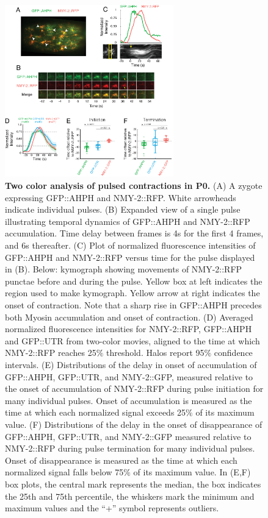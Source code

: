 \begin{figure}[!htbp]
\centering
\includegraphics[width=0.65\textwidth]{pulse/Figure2-14}

\caption{\label{fig:2214} \textbf{Two color analysis of pulsed contractions in P0.} (A) A zygote expressing GFP::AHPH and NMY-2::RFP. White arrowheads indicate individual pulses. (B) Expanded view of a single pulse illustrating temporal dynamics of GFP::AHPH and NMY-2::RFP accumulation. Time delay between frames is 4s for the first 4 frames, and 6s thereafter. (C) Plot of normalized fluorescence intensities of GFP::AHPH and NMY-2::RFP versus time for the pulse displayed in (B). Below: kymograph showing movements of NMY-2::RFP punctae before and during the pulse. Yellow box at left indicates the region used to make kymograph. Yellow arrow at right indicates the onset of contraction. Note that a sharp rise in GFP::AHPH precedes both Myosin accumulation and onset of contraction. (D) Averaged normalized fluorescence intensities for NMY-2::RFP, GFP::AHPH and GFP::UTR from two-color movies, aligned to the time at which NMY-2::RFP reaches 25$\%$ threshold. Halos report 95$\%$ confidence intervals. (E) Distributions of the delay in onset of accumulation of GFP::AHPH, GFP::UTR, and NMY-2::GFP, measured relative to the onset of accumulation of NMY-2::RFP during pulse initiation for many individual pulses. Onset of accumulation is measured as the time at which each normalized signal exceeds 25$\%$ of its maximum value. (F) Distributions of the delay in the onset of disappearance of GFP::AHPH, GFP::UTR, and NMY-2::GFP measured relative to NMY-2::RFP during pulse termination for many individual pulses. Onset of disappearance is measured as the time at which each normalized signal falls below 75$\%$ of its maximum value. In (E,F) box plots, the central mark represents the median, the box indicates the 25th and 75th percentile, the whiskers mark the minimum and maximum values and the ``+” symbol represents outliers.}
\end{figure}






